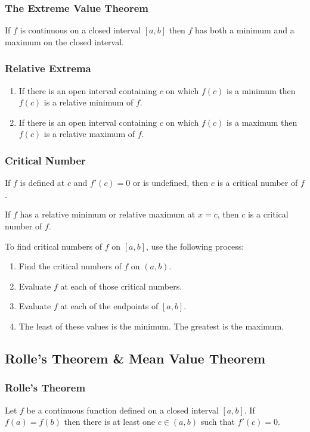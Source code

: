 \subsubsection{The Extreme Value Theorem}
If $f$ is continuous on a closed interval $[a,b]$ then $f$ has both a minimum
and a maximum on the closed interval.

\subsubsection{Relative Extrema}
\begin{enumerate}
  \item If there is an open interval containing $c$ on which $f(c)$ is a
    minimum then $f(c)$ is a relative minimum of $f$.
  \item If there is an open interval containing $c$ on which $f(c)$ is a
    maximum then $f(c)$ is a relative maximum of $f$.
\end{enumerate}

\subsubsection{Critical Number}
If $f$ is defined at $c$ and $f'(c)=0$ or is undefined, then $c$ is a critical
number of $f$.

If $f$ has a relative minimum or relative maximum at $x=c$, then $c$ is a
critical number of $f$.

To find critical numbers of $f$ on $[a,b]$, use the following process:
\begin{enumerate}
  \item Find the critical numbers of $f$ on $(a,b)$.
  \item Evaluate $f$ at each of those critical numbers.
  \item Evaluate $f$ at each of the endpoints of $[a,b]$.
  \item The least of these values is the minimum. The greatest is the maximum.
\end{enumerate}

\subsection{Rolle's Theorem \& Mean Value Theorem}
\subsubsection{Rolle's Theorem}
Let $f$ be a continuous function defined on a closed interval $[a,b]$. If
$f(a)=f(b)$ then there is at least one $c\in(a,b)$ such that $f'(c)=0$.

